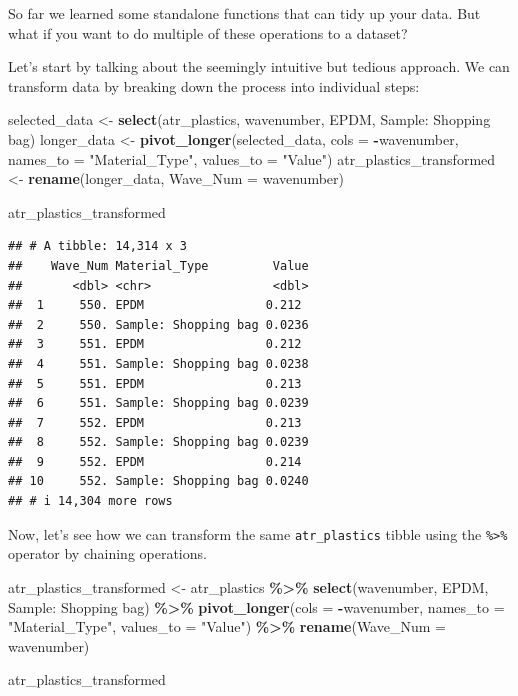\documentclass[
]{book}
\newenvironment{Shaded}{\begin{snugshade}}{\end{snugshade}}
\newcommand{\AttributeTok}[1]{\textcolor[rgb]{0.13,0.29,0.53}{#1}}
\newcommand{\FunctionTok}[1]{\textcolor[rgb]{0.13,0.29,0.53}{\textbf{#1}}}
\newcommand{\NormalTok}[1]{#1}
\newcommand{\OtherTok}[1]{\textcolor[rgb]{0.56,0.35,0.01}{#1}}
\newcommand{\SpecialCharTok}[1]{\textcolor[rgb]{0.81,0.36,0.00}{\textbf{#1}}}
\newcommand{\StringTok}[1]{\textcolor[rgb]{0.31,0.60,0.02}{#1}}
\begin{document}
So far we learned some standalone functions that can tidy up your data. But what if you want to do multiple of these operations to a dataset?

Let's start by talking about the seemingly intuitive but tedious approach. We can transform data by breaking down the process into individual steps:

\begin{Shaded}
\begin{Highlighting}[]
\NormalTok{selected\_data }\OtherTok{\textless{}{-}} \FunctionTok{select}\NormalTok{(atr\_plastics, wavenumber, EPDM, }\StringTok{\textasciigrave{}}\AttributeTok{Sample: Shopping bag}\StringTok{\textasciigrave{}}\NormalTok{)}
\NormalTok{longer\_data }\OtherTok{\textless{}{-}} \FunctionTok{pivot\_longer}\NormalTok{(selected\_data, }\AttributeTok{cols =} \SpecialCharTok{{-}}\NormalTok{wavenumber, }\AttributeTok{names\_to =} \StringTok{"Material\_Type"}\NormalTok{, }\AttributeTok{values\_to =} \StringTok{"Value"}\NormalTok{)}
\NormalTok{atr\_plastics\_transformed }\OtherTok{\textless{}{-}} \FunctionTok{rename}\NormalTok{(longer\_data, }\AttributeTok{Wave\_Num =}\NormalTok{ wavenumber)}

\NormalTok{atr\_plastics\_transformed}
\end{Highlighting}
\end{Shaded}

\begin{verbatim}
## # A tibble: 14,314 x 3
##    Wave_Num Material_Type         Value
##       <dbl> <chr>                 <dbl>
##  1     550. EPDM                 0.212 
##  2     550. Sample: Shopping bag 0.0236
##  3     551. EPDM                 0.212 
##  4     551. Sample: Shopping bag 0.0238
##  5     551. EPDM                 0.213 
##  6     551. Sample: Shopping bag 0.0239
##  7     552. EPDM                 0.213 
##  8     552. Sample: Shopping bag 0.0239
##  9     552. EPDM                 0.214 
## 10     552. Sample: Shopping bag 0.0240
## # i 14,304 more rows
\end{verbatim}

Now, let's see how we can transform the same \texttt{atr\_plastics} tibble using the \texttt{\%\textgreater{}\%} operator by chaining operations.

\begin{Shaded}
\begin{Highlighting}[]
\NormalTok{atr\_plastics\_transformed }\OtherTok{\textless{}{-}}\NormalTok{ atr\_plastics }\SpecialCharTok{\%\textgreater{}\%}
    \FunctionTok{select}\NormalTok{(wavenumber, EPDM, }\StringTok{\textasciigrave{}}\AttributeTok{Sample: Shopping bag}\StringTok{\textasciigrave{}}\NormalTok{) }\SpecialCharTok{\%\textgreater{}\%}
    \FunctionTok{pivot\_longer}\NormalTok{(}\AttributeTok{cols =} \SpecialCharTok{{-}}\NormalTok{wavenumber, }\AttributeTok{names\_to =} \StringTok{"Material\_Type"}\NormalTok{, }\AttributeTok{values\_to =} \StringTok{"Value"}\NormalTok{) }\SpecialCharTok{\%\textgreater{}\%}
    \FunctionTok{rename}\NormalTok{(}\AttributeTok{Wave\_Num =}\NormalTok{ wavenumber)}

\NormalTok{atr\_plastics\_transformed}
\end{Highlighting}
\end{Shaded}
\end{document}
